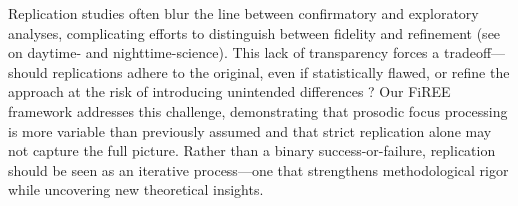 Replication studies often blur the line between confirmatory and exploratory analyses, complicating efforts to distinguish between fidelity and refinement (see \cite{Yanai2020} on daytime- and nighttime-science). This lack of transparency forces a tradeoff—should replications adhere to the original, even if statistically flawed, or refine the approach at the risk of introducing unintended differences \cite{mcmanus2022replication}? Our FiREE framework addresses this challenge, demonstrating that prosodic focus processing is more variable than previously assumed and that strict replication alone may not capture the full picture. Rather than a binary success-or-failure, replication should be seen as an iterative process—one that strengthens methodological rigor while uncovering new theoretical insights.